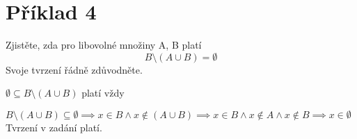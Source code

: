 \section*{Příklad 4}
Zjistěte, zda pro libovolné množiny A, B platí
$$ B \setminus \left(A \cup B \right) = \emptyset $$
Svoje tvrzení řádně zdůvodněte.

\vspace{10pt}

$ \emptyset \subseteq B \setminus \left(A \cup B \right) $ platí vždy

$ B \setminus \left(A \cup B \right) \subseteq \emptyset \implies x \in B \wedge x \notin \left(A \cup B \right) \implies x \in B \wedge x \notin A \wedge x \notin B \implies x \in \emptyset $ \\
Tvrzení v zadání platí.
